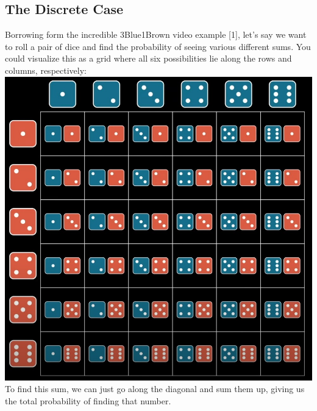 \documentclass{article}
\begin{document}
    \subsection {The Discrete Case}
        Borrowing form the incredible 3Blue1Brown video example [1], let's say we want to roll a pair of dice and find the probability of seeing various different sums. You could visualize this as a grid where all six possibilities lie along the rows and columns, respectively: \\
        \includegraphics[scale=0.4]{images/dice-grid.jpg} \\
        To find this sum, we can just go along the diagonal and sum them up, giving us the total probability of finding that number. \\
        
\end{document}
